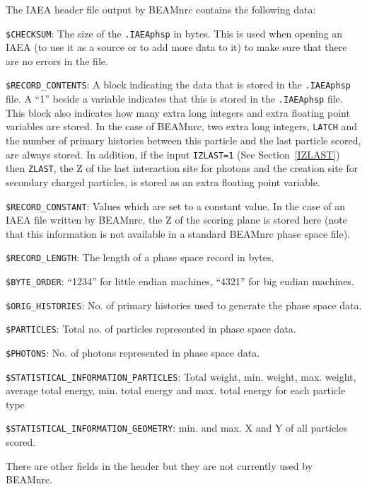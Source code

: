 \documentclass[12pt,twoside]{article}
\begin{document}
The IAEA header file output by BEAMnrc contains the following data:\\
\begin{description}
\item {\tt \$CHECKSUM}: The size of the {\tt .IAEAphsp} in bytes.  This is
used when opening an IAEA (to use it as a source or to add more data to it) to make
sure that there are no errors in the file.
\item {\tt \$RECORD\_CONTENTS}: A block indicating the data that is stored in
the {\tt .IAEAphsp} file.  A ``1'' beside a variable indicates that this is stored
in the {\tt .IAEAphsp} file.  This block also indicates how many extra long integers
and extra floating point variables are stored.  In the case of BEAMnrc, two extra long integers,
{\tt LATCH} and the number of primary histories between this particle and the last
particle scored, are always stored.  In addition, if the input {\tt IZLAST=1}
(See Section~\ref{IZLAST}) then {\tt ZLAST}, the Z of the last interaction site for
photons and the creation site for secondary charged particles, is stored as an
extra floating point variable.
\item {\tt \$RECORD\_CONSTANT}: Values which are set to a constant value.  In the case of
an IAEA file written by BEAMnrc, the Z of the scoring plane is stored here (note that this information is not
available in a standard BEAMnrc phase space file).
\item {\tt \$RECORD\_LENGTH}: The length of a phase space record in bytes.
\item {\tt \$BYTE\_ORDER}: ``1234'' for little endian machines, ``4321'' for big
endian machines.
\item {\tt \$ORIG\_HISTORIES}: No. of primary histories used to generate the phase space data.
\item {\tt \$PARTICLES}: Total no. of particles represented in phase space data.
\item {\tt \$PHOTONS}: No. of photons represented in phase space data.
\item {\tt \$STATISTICAL\_INFORMATION\_PARTICLES}: Total weight, min. weight, max. weight, average total energy, min. total energy and max. total energy for each particle type
\item {\tt \$STATISTICAL\_INFORMATION\_GEOMETRY}: min. and max. X and Y of all particles scored.
\end{description}
There are other fields in the header but they are not currently used by BEAMnrc.
\end{document}
